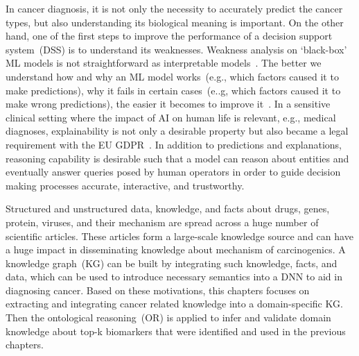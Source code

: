 \hspace*{3.5mm} In cancer diagnosis, it is not only the necessity to accurately predict the cancer types, but also understanding its biological meaning is important. %
On the other hand, one of the first steps to improve the performance of a decision support system~(DSS) is to understand its weaknesses. Weakness analysis on `black-box' ML models is not straightforward as interpretable models~\cite{bhatt2020explainable}. The better we understand how and why an ML model works~(e.g., which factors caused it to make predictions), why it fails in certain cases~(e..g, which factors caused it to make wrong predictions), the easier it becomes to improve it~\cite{miller2018explanation}. 
In a sensitive clinical setting where the impact of AI on human life is relevant, e.g., medical diagnoses, explainability is not only a desirable property but also became a legal requirement with the EU GDPR~\cite{karmakar2019tight}. In addition to predictions and explanations, reasoning capability is desirable such that a model can reason about entities and eventually answer queries posed by human operators in order to guide decision making processes accurate, interactive, and trustworthy.  


\hspace*{3.5mm} Structured and unstructured data, knowledge, and facts about drugs, genes, protein, viruses, and their mechanism are spread across a huge number of scientific articles. These articles form a large-scale knowledge source and can have a huge impact in disseminating knowledge about mechanism of carcinogenics. A knowledge graph~(KG) can be built by integrating such knowledge, facts, and data, which can be used to introduce necessary semantics into a DNN to aid in diagnosing cancer. 
Based on these motivations, this chapters focuses on extracting and integrating cancer related knowledge into a domain-specific KG. Then the ontological reasoning~(OR) is applied to infer and validate domain knowledge about top-k biomarkers that were identified and used in the previous chapters. %

